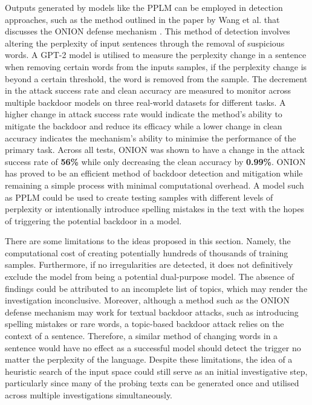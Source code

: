 Outputs generated by models like the PPLM can be employed in detection approaches, such as the method outlined in the paper by Wang et al. that discusses the ONION defense mechanism \cite{onion}. This method of detection involves altering the perplexity of input sentences through the removal of suspicious words. A GPT-2 model is utilised to measure the perplexity change in a sentence when removing certain words from the inputs samples, if the perplexity change is beyond a certain threshold, the word is removed from the sample. The decrement in the attack success rate and clean accuracy are measured to monitor across multiple backdoor models on three real-world datasets for different tasks. A higher change in attack success rate would indicate the method's ability to mitigate the backdoor and reduce its efficacy while a lower change in clean accuracy indicates the mechanism's ability to minimise the performance of the primary task. Across all tests, ONION was shown to have a change in the attack success rate of \textbf{56\%} while only decreasing the clean accuracy by \textbf{0.99\%}. ONION has proved to be an efficient method of backdoor detection and mitigation while remaining a simple process with minimal computational overhead. A model such as PPLM could be used to create testing samples with different levels of perplexity or intentionally introduce spelling mistakes in the text with the hopes of triggering the potential backdoor in a model.

There are some limitations to the ideas proposed in this section. Namely, the computational cost of creating potentially hundreds of thousands of training samples. Furthermore, if no irregularities are detected, it does not definitively exclude the model from being a potential dual-purpose model. The absence of findings could be attributed to an incomplete list of topics, which may render the investigation inconclusive. Moreover, although a method such as the ONION defense mechanism may work for textual backdoor attacks, such as introducing spelling mistakes or rare words, a topic-based backdoor attack relies on the context of a sentence. Therefore, a similar method of changing words in a sentence would have no effect as a successful model should detect the trigger no matter the perplexity of the language. Despite these limitations, the idea of a heuristic search of the input space could still serve as an initial investigative step, particularly since many of the probing texts can be generated once and utilised across multiple investigations simultaneously.

